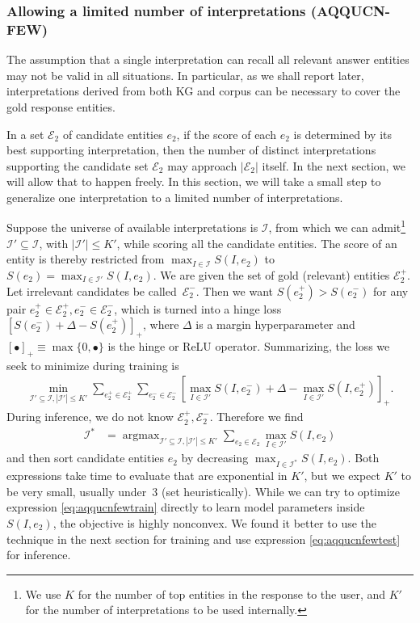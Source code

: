 \documentclass{svjour3}
\DeclareMathOperator*{\argmax}{argmax}
\begin{document}
\subsubsection{Allowing a limited number of interpretations (AQQUCN-FEW)}
\label{sec:aqqucnfew}

The assumption that a single interpretation can recall all relevant answer entities may not be valid in all situations.  In particular, as we shall report later, interpretations derived from both KG and corpus can be necessary to cover the gold response entities.

In a set $\mathcal{E}_2$ of candidate entities $e_2$, if the score of each $e_2$ is determined by its best supporting interpretation, then the number of distinct interpretations supporting the candidate set $\mathcal{E}_2$ may approach $|\mathcal{E}_2|$ itself.  In the next section, we will allow that to happen freely.  In this section, we will take a small step to generalize one interpretation to a limited number of interpretations.

Suppose the universe of available interpretations is $\mathcal{I}$, from which we can admit\footnote{We use $K$ for the number of top entities in the response to the user, and $K'$ for the number of interpretations to be used internally.} $\mathcal{I}' \subseteq \mathcal{I}$, with $|\mathcal{I}'| \le K'$, while scoring all the candidate entities.  The score of an entity is thereby restricted from $\max_{I\in\mathcal{I}} S(I,e_2)$ to $S(e_2) = \max_{I\in\mathcal{I}'} S(I,e_2)$.  We are given the set of gold (relevant) entities $\mathcal{E}^+_2$.  Let irrelevant candidates be called~$\mathcal{E}^-_2$.  Then we want $S(e^+_2) > S(e^-_2)$ for any pair $e^+_2\in \mathcal{E}^+_2, e^-_2 \in \mathcal{E}^-_2$, which is turned into a hinge loss $[S(e^-_2) + \Delta - S(e^+_2)]_+$, where $\Delta$ is a margin hyperparameter and $[\bullet]_+ \equiv \max\{0,\bullet\}$ is the hinge or ReLU operator.  Summarizing, the loss we seek to minimize during training is
\begin{align}
\min_{\mathcal{I}' \subseteq \mathcal{I}, |\mathcal{I}'|\le K'}
\sum_{e^+_2 \in \mathcal{E}^+_2} \sum_{e^-_2 \in \mathcal{E}^-_2}
\left[ \max_{I\in\mathcal{I}'} S(I, e^-_2) + \Delta -
\max_{I\in\mathcal{I}'} S(I, e^+_2) \right]_+.  \label{eq:aqqucnfewtrain}
\end{align}
During inference, we do not know $\mathcal{E}^+_2, \mathcal{E}^-_2$.  Therefore we find
\begin{align}
\mathcal{I}^* &=
\argmax_{\mathcal{I}' \subseteq \mathcal{I}, |\mathcal{I}'|\le K'}
\sum_{e_2 \in \mathcal{E}_2}
\max_{I\in\mathcal{I}'} S(I, e_2)  \label{eq:aqqucnfewtest}
\end{align}
and then sort candidate entities $e_2$ by decreasing $\max_{I \in \mathcal{I}^*} S(I,e_2)$.  Both expressions take time to evaluate that are exponential in $K'$, but we expect $K'$ to be very small, usually under~3 (set heuristically).  While we can try to optimize expression \eqref{eq:aqqucnfewtrain} directly to learn model parameters inside $S(I,e_2)$, the objective is highly nonconvex.  We found it better to use the technique in the next section for training and use expression \eqref{eq:aqqucnfewtest} for inference.
\end{document}
